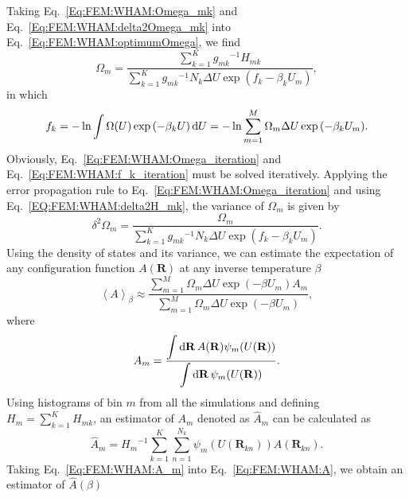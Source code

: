 Taking Eq.~\ref{Eq:FEM:WHAM:Omega_mk} and Eq.~\ref{Eq:FEM:WHAM:delta2Omega_mk} into Eq.~\ref{Eq:FEM:WHAM:optimumOmega}, we find
\begin{equation}
\Omega_m=\frac{\sum\limits_{k=1}^{K}{g_{mk}}^{-1}H_{mk}}{\sum\limits_{k=1}^{K}{g_{mk}}^{-1}N_k\Delta U\exp{(f_k-\beta_kU_m)}},
\label{Eq:FEM:WHAM:Omega_iteration}
\end{equation}
in which
\begin{equation}
f_k=-\ln \int \Omega(U)\exp{(-\beta_k U)}\mathop{}\!\mathrm{d} U=-\ln\sum\limits_{m=1}^M\Omega_m\Delta U\exp{(-\beta_kU_m)}.
\label{Eq:FEM:WHAM:f_k_iteration}
\end{equation}
Obviously, Eq.~\ref{Eq:FEM:WHAM:Omega_iteration} and Eq.~\ref{Eq:FEM:WHAM:f_k_iteration} must be solved iteratively.
Applying the error propagation rule to Eq.~\ref{Eq:FEM:WHAM:Omega_iteration} and using Eq.~\ref{EQ:FEM:WHAM:delta2H_mk}, the variance of $\Omega_m$ is given by
\begin{equation}
\delta^2 \Omega_m=\frac{\Omega_m}{\sum\limits_{k=1}^K{g_{mk}}^{-1}N_k\Delta U\exp{(f_k-\beta_kU_m)}}.
\end{equation}
Using the density of states and its variance, we can estimate the expectation of any configuration function $A(\mathbf{R})$ at any inverse temperature $\beta$
\begin{equation}
\left<A\right>_\beta\approx\frac{\sum\limits_{m=1}^M\Omega_m\Delta U\exp{(-\beta U_m)}A_m}{\sum\limits_{m=1}^M\Omega_m\Delta U\exp{(-\beta U_m)}},
\label{Eq:FEM:WHAM:A}
\end{equation}
where
\begin{equation}
A_m=\frac{\displaystyle\int \mathop{}\!\mathrm{d}\mathbf{R}\,A(\mathbf{R})\psi_m(U(\mathbf{R}))}{\displaystyle\int \mathop{}\!\mathrm{d}\mathbf{R}\,\psi_m(U(\mathbf{R}))}.
\end{equation}
Using histograms of bin $m$ from all the simulations and defining $H_m=\sum\limits_{k=1}^KH_{mk}$, an estimator of $A_m$ denoted as $\hat{A}_m$ can be calculated as
\begin{equation}
   \hat{A}_m={H_{m}}^{-1}\sum\limits_{k=1}^K\sum\limits_{n=1}^{N_k}\psi_m(U(\mathbf{R}_{kn}))A(\mathbf{R}_{kn}).
   \label{Eq:FEM:WHAM:A_m}
\end{equation}
Taking Eq.~\ref{Eq:FEM:WHAM:A_m} into Eq.~\ref{Eq:FEM:WHAM:A}, we obtain an estimator of $\hat{A}(\beta)$

